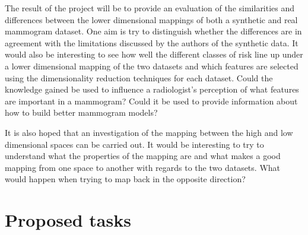\documentclass[11pt,fleqn,twoside]{article}
\begin{document}
The result of the project will be to provide an evaluation of the similarities and differences between the lower dimensional mappings of both a synthetic and real mammogram dataset. One aim is try to distinguish whether the differences are in agreement with the limitations discussed by the authors of the synthetic data. It would also be interesting to see how well the different classes of risk line up under a lower dimensional mapping of the two datasets and which features are selected using the dimensionality reduction techniques for each dataset. Could the knowledge gained be used to influence a radiologist's perception of what features are important in a mammogram? Could it be used to provide information about how to build better mammogram models?

It is also hoped that an investigation of the mapping between the high and low dimensional spaces can be carried out. It would be interesting to try to understand what the properties of the mapping are and what makes a good mapping from one space to another with regards to the two datasets. What would happen when trying to map back in the opposite direction?

\section{Proposed tasks}
\end{document}
